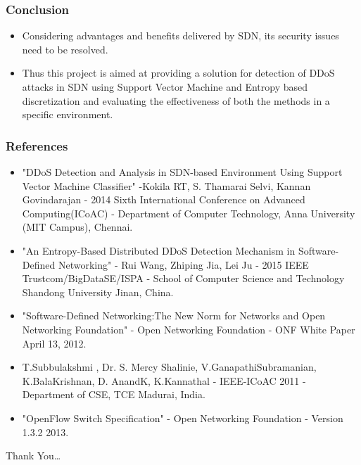 \documentclass[10pt]{beamer}
\begin{document}
\begin{frame}
\frametitle{Conclusion}

\begin{itemize}
\footnotesize
\item
Considering advantages and benefits delivered by SDN, its security issues need to be resolved.
\item
Thus this project is aimed at providing a solution for detection of DDoS attacks in SDN using Support Vector Machine and Entropy based discretization and evaluating the effectiveness of both the methods in a specific environment.
\end{itemize}
\end{frame}


\begin{frame}
\frametitle{References}
\begin{itemize}
\footnotesize
\item
"DDoS Detection and Analysis in SDN-based Environment Using Support Vector Machine Classifier" -Kokila RT, S. Thamarai Selvi, Kannan Govindarajan - 2014 Sixth International Conference on Advanced Computing(ICoAC) - Department of Computer Technology, Anna University (MIT Campus), Chennai.

\item
"An Entropy-Based Distributed DDoS Detection Mechanism in Software-Defined Networking" - Rui Wang, Zhiping Jia, Lei Ju - 2015 IEEE Trustcom/BigDataSE/ISPA - School of Computer Science and Technology Shandong University Jinan, China.

\item
"Software-Defined Networking:The New Norm for Networks and 
Open Networking Foundation" - Open Networking Foundation - ONF White Paper April 13, 2012.

\item
T.Subbulakshmi , Dr. S. Mercy Shalinie, V.GanapathiSubramanian, K.BalaKrishnan, D. AnandK, K.Kannathal - IEEE-ICoAC 2011 - Department of CSE, TCE Madurai, India.

\item
"OpenFlow Switch Specification" - Open Networking Foundation - Version 1.3.2 2013.

\end{itemize}
\end{frame}

\begin{frame}{}
\Huge
Thank You\ldots
\end{frame}
\end{document}
